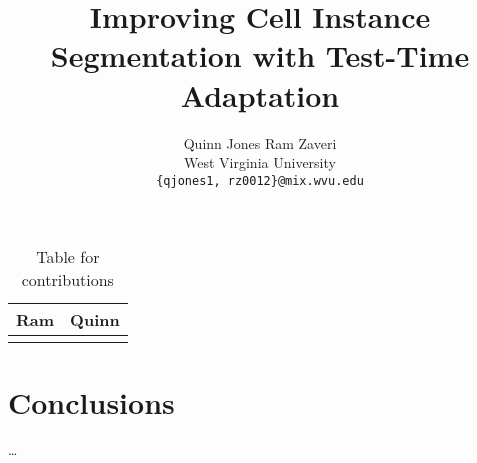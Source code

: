 \documentclass[10pt,twocolumn,letterpaper]{article}
\author{Quinn Jones \qquad Ram Zaveri \\
West Virginia University\\
{\tt\small \{qjones1, rz0012\}@mix.wvu.edu}
}
\begin{document}
\begin{table}[h]
\centering
\begin{tabular}{|c|c|}
\hline
\textbf{Ram} & \textbf{Quinn} \\ \hline
 &  \\ \hline
\end{tabular}
\caption{Table for contributions}
\label{tab:ram_quinn}
\end{table}


\pagebreak\pagebreak
\title{Improving Cell Instance Segmentation with Test-Time Adaptation}
\maketitle
    





\section{Conclusions}
\dots

{
    \small
    
    
}

% 
\end{document}
